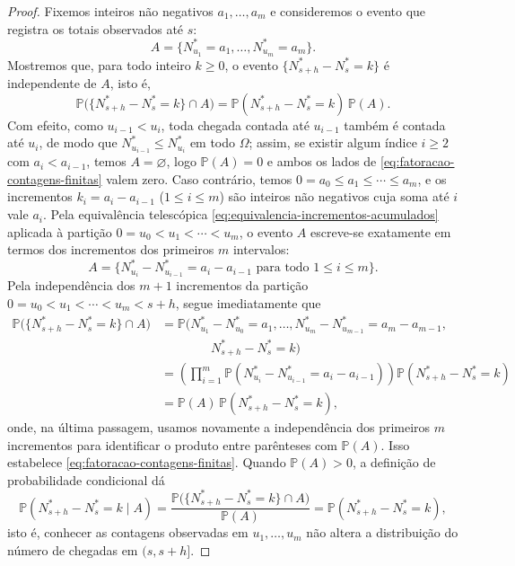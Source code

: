 \documentclass[12pt,portuguese]{article}
\theoremstyle{definition}
\theoremstyle{plainexercise}
\theoremstyle{starredexercise}
\theoremstyle{definition}
\begin{document}
\begin{proof}
Fixemos inteiros não negativos $a_1,\ldots,a_m$ e consideremos o evento que
registra os totais observados até $s$:
\[
  A=\{N_{u_1}^*=a_1,\ldots,N_{u_m}^*=a_m\}.
\]
Mostremos que, para todo inteiro $k\geqslant0$, o evento $\{N_{s+h}^*-N_s^*=k\}$
é independente de $A$, isto é,
\begin{equation}\label{eq:fatoracao-contagens-finitas}
  \mathbb{P}\bigl(\{N_{s+h}^*-N_s^*=k\}\cap A\bigr)
  =\mathbb{P}(N_{s+h}^*-N_s^*=k)\,\mathbb{P}(A).
\end{equation}
Com efeito, como $u_{i-1}<u_i$, toda chegada contada até $u_{i-1}$ também é
contada até $u_i$, de modo que $N_{u_{i-1}}^*\leqslant N_{u_i}^*$ em todo
$\Omega$; assim, se existir algum índice $i\geqslant2$ com $a_i<a_{i-1}$,
temos $A=\varnothing$, logo $\mathbb{P}(A)=0$ e ambos os lados de
\eqref{eq:fatoracao-contagens-finitas} valem zero. Caso contrário,
temos $0=a_0\leqslant a_1\leqslant\cdots\leqslant a_m$, e os incrementos
$k_i=a_i-a_{i-1}$ ($1\leqslant i\leqslant m$) são inteiros não negativos cuja
soma até $i$ vale $a_i$. Pela equivalência telescópica
\eqref{eq:equivalencia-incrementos-acumulados} aplicada à partição
$0=u_0<u_1<\cdots<u_m$, o evento $A$ escreve-se exatamente em termos dos
incrementos dos primeiros $m$ intervalos:
\[
  A=\bigl\{N_{u_i}^*-N_{u_{i-1}}^*=a_i-a_{i-1}\text{ para todo }1\leqslant i\leqslant m\bigr\}.
\]
Pela independência dos $m+1$ incrementos da partição
$0=u_0<u_1<\cdots<u_m<s+h$, segue imediatamente que
\begin{align*}
  \mathbb{P}\bigl(\{N_{s+h}^*-N_s^*=k\}\cap A\bigr)
  &=\mathbb{P}\bigl(N_{u_1}^*-N_{u_0}^*=a_1,\ldots,N_{u_m}^*-N_{u_{m-1}}^*=a_m-a_{m-1},
  \\[0.15cm]
  &\qquad\qquad N_{s+h}^*-N_s^*=k\bigr)
  \\[0.3cm]
  &=\left(\prod_{i=1}^{m}\mathbb{P}(N_{u_i}^*-N_{u_{i-1}}^*=a_i-a_{i-1})\right)
    \mathbb{P}(N_{s+h}^*-N_s^*=k)
  \\[0.3cm]
  &=\mathbb{P}(A)\,\mathbb{P}(N_{s+h}^*-N_s^*=k),
\end{align*}
onde, na última passagem, usamos novamente a independência dos primeiros $m$
incrementos para identificar o produto entre parênteses com $\mathbb{P}(A)$.
Isso estabelece \eqref{eq:fatoracao-contagens-finitas}. Quando $\mathbb{P}(A)>0$,
a definição de probabilidade condicional dá
\[
  \mathbb{P}(N_{s+h}^*-N_s^*=k\mid A)
  =\frac{\mathbb{P}\bigl(\{N_{s+h}^*-N_s^*=k\}\cap A\bigr)}{\mathbb{P}(A)}
  =\mathbb{P}(N_{s+h}^*-N_s^*=k),
\]
isto é, conhecer as contagens observadas em $u_1,\ldots,u_m$ não altera a
distribuição do número de chegadas em $(s,s+h]$.


\end{proof}
\end{document}
